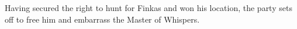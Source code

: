 Having secured the right to hunt for Finkas and won his location, the party sets off to free him and embarrass the Master of Whispers.
